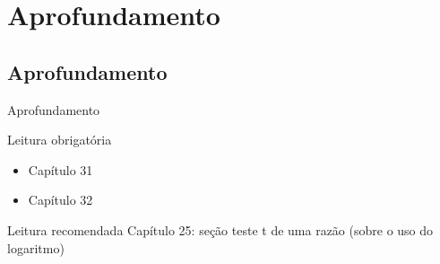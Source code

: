 \documentclass{beamer}
\begin{document}


\section{Aprofundamento}

\subsection{Aprofundamento}

\begin{frame}{\scriptsize Aprofundamento}
  \begin{block}{Leitura obrigatória}
    \begin{itemize}
      \footnotesize
    \item Capítulo 31
    \item Capítulo 32
    \end{itemize}
  \end{block}
  \begin{block}{Leitura recomendada}
    \scriptsize
    Capítulo 25: seção teste t de uma razão ({\tiny sobre o uso do logaritmo})


  \end{block}
\end{frame}
\end{document}
